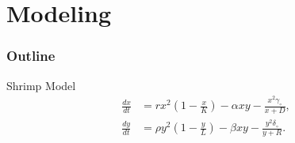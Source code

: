 
\section{Modeling}
\begin{frame}
  \frametitle{Outline}
  \tableofcontents[ currentsection ]
\end{frame}

\begin{frame}{Shrimp Model}
  \begin{align*}
    \frac{dx}{dt} & = rx^2 \left(1-\frac{x}{K}\right) - \alpha xy - \frac{x^2 \gamma_\circ}{x+D}, \\
    \frac{dy}{dt} & = \rho y^2 \left(1-\frac{y}{L}\right) - \beta xy -\frac{y^2 \delta_\circ}{y+R}.
  \end{align*}
\end{frame}